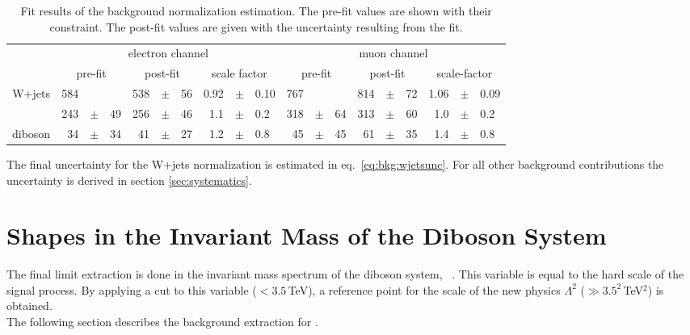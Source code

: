 \begin{table}[]
	\centering
	\caption[Fit results of the background normalization estimation]{Fit results of the background normalization estimation. The pre-fit values are shown with their constraint. The post-fit values are given with the uncertainty resulting from the fit.}
	\label{tab:bkg:mjresults}
	\begin{tabular}{cr@{\,}c@{\,}lr@{\,}c@{\,}lr@{\,}c@{\,}lr@{\,}c@{\,}lr@{\,}c@{\,}lr@{\,}c@{\,}l}
		\hline
        & \multicolumn{9}{c}{electron channel} & \multicolumn{9}{c}{muon channel} \\
		& \multicolumn{3}{c}{pre-fit} & \multicolumn{3}{c}{post-fit} & \multicolumn{3}{c}{scale factor} & \multicolumn{3}{c}{pre-fit} & \multicolumn{3}{c}{post-fit} & \multicolumn{3}{c}{scale-factor} \\
		\hline
		W+jets     & 584 &     &    & 538 &$\pm$& 56 & 0.92 &$\pm$& 0.10 & 767 &     &    & 814 &$\pm$& 72  & 1.06 &$\pm$& 0.09 \\
		\ttbar     & 243 &$\pm$& 49 & 256 &$\pm$& 46 & 1.1  &$\pm$& 0.2  & 318 &$\pm$& 64 & 313 &$\pm$& 60  & 1.0  &$\pm$& 0.2 \\
		diboson    & 34  &$\pm$& 34 & 41  &$\pm$& 27 &1.2   &$\pm$& 0.8  & 45  &$\pm$& 45 &  61 &$\pm$& 35  &  1.4 &$\pm$& 0.8 \\
		\hline
	\end{tabular}
\end{table}

The final uncertainty for the W+jets normalization is estimated in eq.~\ref{eq:bkg:wjetsunc}. For all other background contributions the uncertainty is derived in section \ref{sec:systematics}.


\section{Shapes in the Invariant Mass of the Diboson System}
The final limit extraction is done in the invariant mass spectrum of the diboson system, \MWV \ . This variable is equal to the hard scale of the signal process. By applying a cut to this variable ($<3.5$\,TeV), a reference point for the scale of the new physics $\Lambda^2$ ($\gg3.5^2$\,TeV$^2$) is obtained. \\
The following section describes the background extraction for \MWV .

